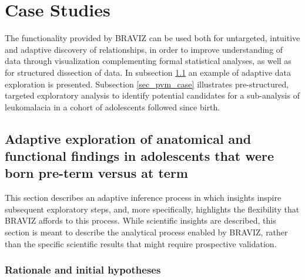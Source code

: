 \documentclass[twocolumn]{svjour3}
\begin{document}
\section{Case Studies}

The functionality provided by BRAVIZ can be used both for untargeted, intuitive and adaptive discovery of relationships, in order to improve understanding of data through visualization complementing formal statistical analyses, as well as for structured dissection of data. In subsection \ref{sec_case_cyril} an example of adaptive data exploration is presented. Subsection \ref{sec_pvm_case} illustrates pre-structured, targeted exploratory analysis to identify potential candidates for a sub-analysis of leukomalacia in a cohort of adolescents followed since birth. 
 
\subsection{Adaptive exploration of anatomical and functional findings in adolescents that were born pre-term versus at term}
\label{sec_case_cyril}

This section describes an adaptive inference process in which insights inspire subsequent exploratory steps, and, more specifically, highlights the flexibility that BRAVIZ affords to this process. While scientific insights are described, this section is meant to describe the analytical process enabled by BRAVIZ, rather than the specific scientific results that might require prospective validation.

\subsubsection{Rationale and initial hypotheses}
\end{document}
